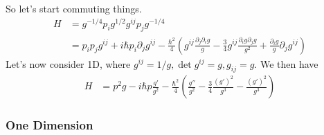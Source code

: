 So let's start commuting things.  
\begin{align}
H &= g^{-1/4}p_i  g^{1/2}g^{ij}p_j g^{-1/4}\\
& =  p_i p_j g^{ij} + i\hbar p_i \partial_j g^{ij} - \frac{\hbar^2}{4}\left(g^{ij}\frac{\partial_j\partial_i g}{g} - \frac{3}{4}g^{ij}\frac{\partial_ig \partial_jg}{g^{2}} + \frac{\partial_i g}{g}\partial_jg^{ij} \right)
\end{align}
Let's now consider 1D, where $g^{ij} = 1/g, \det{g^{ij}} = g, g_{ij} = g$.  We then have 
\begin{align}
H & =  p^2g - i\hbar p \frac{g'}{g^2} - \frac{\hbar^2}{4}\left(\frac{g''}{g^2} - \frac{3}{4}\frac{(g')^2}{g^{3}} - \frac{(g')^2}{g^3} \right)
\end{align}

\subsubsection{One Dimension}

